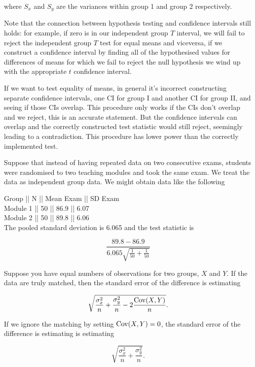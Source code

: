 \documentclass{homework}
\begin{document}
where $S_x$ and $S_y$ are the variances within group 1 and group 2 respectively. 

Note that the connection between hypothesis testing and confidence intervals still holds: for example, if zero is in our independent group $T$ interval, we will fail to reject the independent group $T$ test for equal means and viceversa, if we construct a confidence interval by finding all of the hypothesised values for differences of means for which we fail to reject the null hypothesis we wind up with the appropriate $t$ confidence interval. 

If we want to test equality of means, in general it's incorrect constructing separate confidence intervals, one CI for group I and another CI for group II, and seeing if those CIs overlap. This procedure only works if the CIs don't overlap and we reject, this is an accurate statement. But the confidence intervals can overlap and the correctly constructed test statistic would still reject, seemingly leading to a contradiction.  This procedure has lower power than the correctly implemented test.

\begin{tcolorbox}[title=Exam]

Suppose that instead of having repeated data on two consecutive exams, students were randomised to two teaching modules and took the same exam. We treat the data as independent group data. We might obtain data like the following 

Group || N || Mean Exam || SD Exam \\
Module 1 || 50 || 86.9 || 6.07 \\
Module 2 || 50 || 89.8 || 6.06 \\

The pooled standard deviation is 6.065 and the test statistic is 

$$
\frac{89.8-86.9}{6.065\sqrt{\frac{1}{50}+\frac{1}{50}}}
$$
\end{tcolorbox}

Suppose you have equal numbers of observations for two groups, $X$ and $Y$. If the data are truly matched, then the standard error of the difference is estimating 

$$
\sqrt{\frac{\sigma_x^2}{n}+\frac{\sigma_y^2}{n}-2\frac{\textnormal{Cov}(X,Y)}{n}}.
$$

If we ignore the matching by setting $\textnormal{Cov}(X,Y) = 0$, the standard error of the difference is estimating is estimating

$$
\sqrt{\frac{\sigma_x^2}{n}+\frac{\sigma_y^2}{n}}.
$$
\end{document}
